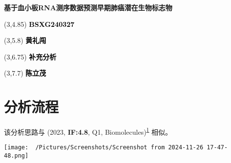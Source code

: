 \documentclass[
]{article}
\author{}
\date{\vspace{-2.5em}}
\begin{document}
\begin{titlepage} 
\begin{center} \textbf{\huge
基于血小板RNA测序数据预测早期肺癌潜在生物标志物}
\vspace{4em} \begin{textblock}{10}(3,4.85) \Large
\textbf{\textcolor{black}{BSXG240327}}
\end{textblock} \begin{textblock}{10}(3,5.8)
\Large \textbf{\textcolor{black}{黄礼闯}}
\end{textblock} \begin{textblock}{10}(3,6.75)
\Large \textbf{\textcolor{black}{补充分析}}
\end{textblock} \begin{textblock}{10}(3,7.7)
\Large \textbf{\textcolor{black}{陈立茂}}
\end{textblock} \end{center} \end{titlepage}
\restoregeometry


\begin{center}\vspace{1.5cm}\end{center}\tableofcontents

\begin{center}\vspace{1.5cm}\end{center}\listoffigures

\begin{center}\vspace{1.5cm}\end{center}\listoftables

\newpage


\hypertarget{abstract}{%
\section{分析流程}\label{abstract}}

该分析思路与 (2023, \textbf{IF:4.8}, Q1, Biomolecules)\textsuperscript{\protect\hyperlink{ref-HCC_RNA_Sequen_Wang_2023}{1}} 相似。

\begin{center}\vspace{1.5cm}\end{center}
\def\@captype{figure}
\begin{center}
\texttt{[image: ~/Pictures/Screenshots/Screenshot from 2024-11-26 17-47-48.png]}
\caption{Unnamed chunk 7}\label{fig:unnamed-chunk-7}
\end{center}
\end{document}
